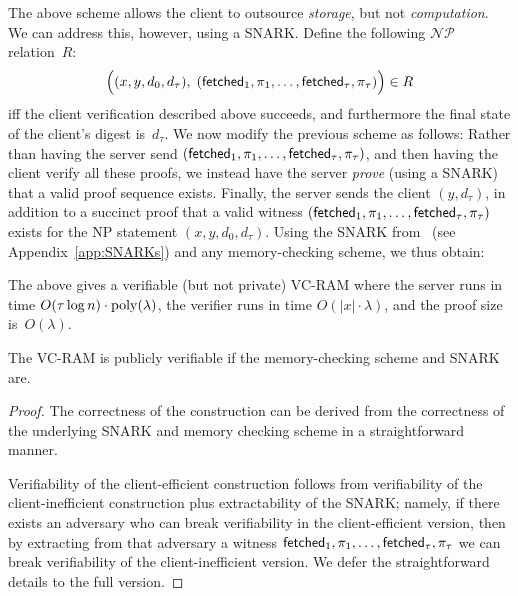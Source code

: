 The above scheme allows the client to outsource \emph{storage}, but not \emph{computation}.
We can address this, however, using a SNARK. Define the following $\mathcal{NP}$
relation~$R$:
\[\left( \rule{0pt}{10pt} (x, y, d_0, d_\tau), \; ({\sf fetched}_1, \pi_1, \ldots, {\sf fetched}_\tau, \pi_\tau) \right) \in R\]
iff the client verification described above succeeds, and furthermore the final
state of the client's digest is~$d_\tau$.
We now modify the previous scheme as follows:
Rather than having the server send $({\sf fetched}_1, \pi_1, \ldots, {\sf fetched}_\tau, \pi_\tau)$,
and then having
the client verify all these proofs, we instead have the server \emph{prove} (using a SNARK)
that a valid proof sequence exists. Finally, the server sends 
the client $(y, d_\tau)$, in addition to a succinct proof 
that a valid witness 
$({\sf fetched}_1, \pi_1, \ldots, {\sf fetched}_\tau, \pi_\tau)$ exists
for the NP statement $(x, y, d_0, d_\tau)$.
Using the SNARK from~\cite{spanprogram} (see Appendix~\ref{app:SNARKs}) and
any memory-checking scheme, we thus obtain:




\begin{thm}
\label{thm:vc}
The above gives a verifiable (but not private) 
VC-RAM where the server runs in time $O(\tau \log n) \cdot {\rm poly}(\lambda)$,
the verifier runs in time $O(|x| \cdot \lambda)$, and the proof size is~$O(\lambda)$.

The VC-RAM is publicly verifiable if the memory-checking scheme and SNARK are.
\end{thm}
\begin{proof}
The correctness of the construction can be derived from the correctness
of the underlying SNARK and memory checking scheme in a straightforward
manner.

Verifiability of the client-efficient construction follows from verifiability
of the client-inefficient construction plus extractability of the SNARK; namely,
if there exists an adversary who can break verifiability in the client-efficient version,
then by extracting from that adversary a witness ${\sf fetched}_1, \pi_1, \ldots, {\sf fetched}_\tau, \pi_\tau$
we can break verifiability of the client-inefficient version.
We defer the straightforward details to the full version.
\end{proof}



